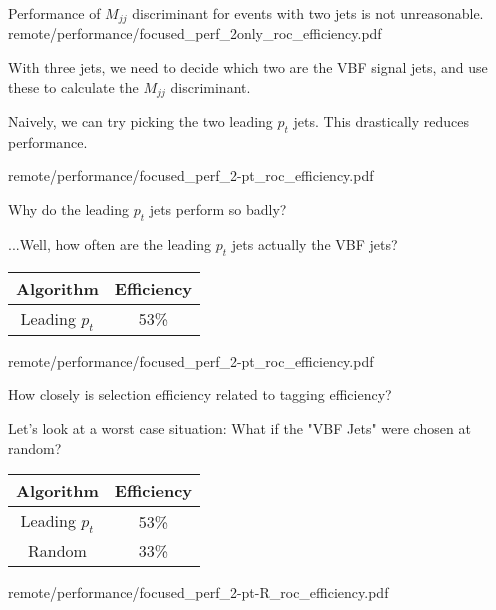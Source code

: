 


    {Performance of $M_{jj}$ discriminant for events with two jets is not unreasonable.}
    {remote/performance/focused_perf_2only_roc_efficiency.pdf}

    { \footnotesize
        With three jets, we need to decide which two are the VBF signal jets, and use these to calculate the $M_{jj}$ discriminant.

        \vspace{5mm}

        Naively, we can try picking the two leading $p_t$ jets. This drastically reduces performance.
    }
    {remote/performance/focused_perf_2-pt_roc_efficiency.pdf}

    { \footnotesize
        Why do the leading $p_t$ jets perform so badly?

        \vspace{5mm}

        ...Well, how often are the leading $p_t$ jets actually the VBF jets?

        \vspace{5mm}

        \begin{tabular}{|c|c|}\hline
        Algorithm & Efficiency \\
        \hline
        Leading $p_t$ & 53\% \\
        \hline
        \end{tabular}
    }
    {remote/performance/focused_perf_2-pt_roc_efficiency.pdf}

    { \footnotesize
        How closely is selection efficiency related to tagging efficiency?

        Let's look at a worst case situation:
        What if the "VBF Jets" were chosen at random?

        \vspace{5mm}

        \begin{tabular}{|c|c|}\hline
        Algorithm & Efficiency \\ \hline
        Leading $p_t$ & 53\% \\ \hline
        Random & 33\% \\ \hline
        \end{tabular}
    }
    {remote/performance/focused_perf_2-pt-R_roc_efficiency.pdf}

